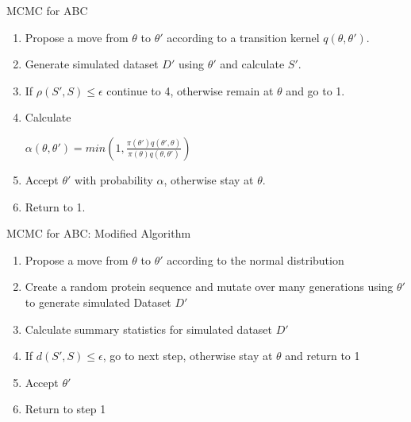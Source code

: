 \documentclass{beamer}
\begin{document}
	\begin{frame}{MCMC for ABC}
		
		\begin{enumerate}
			\item Propose a move from $\theta$ to $\theta'$ according to a transition kernel $q(\theta,\theta')$.
			\item Generate simulated dataset $D'$ using $\theta'$ and calculate $S'$.
			\item If $\rho(S', S) \le \epsilon$ continue to 4, otherwise remain at $\theta$ and go to 1.
			\item Calculate \newline \begin{center}$\alpha(\theta, \theta') = min(1, \frac{\pi(\theta')q(\theta',\theta)}{\pi(\theta)q(\theta, \theta')})$ \end{center}
			\item Accept $\theta'$ with probability $\alpha$, otherwise stay at $\theta$.
			\item Return to 1.
		\end{enumerate}
	
	\end{frame}

	\begin{frame}{MCMC for ABC: Modified Algorithm}
	
		\begin{enumerate}
			\item Propose a move from $\theta$ to $\theta'$ according to the normal distribution \pause
			\item Create a random protein sequence and mutate over many generations using $\theta'$ to generate simulated Dataset $D'$ \pause
			\item Calculate summary statistics for simulated dataset $D'$ \pause
			\item If $d(S',S) \le \epsilon$, go to next step, otherwise stay at $\theta$ and return to 1 \pause
			\item Accept $\theta'$ \pause
			\item Return to step 1
		\end{enumerate}
	
	\end{frame}
\end{document}
